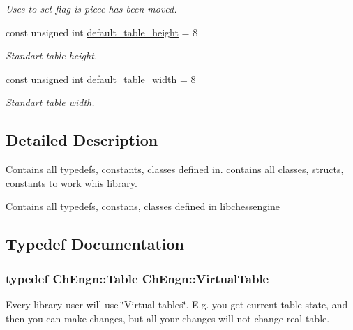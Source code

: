 \begin{DoxyCompactItemize}
\begin{DoxyCompactList}\small\item\em Uses to set flag is piece has been moved. \item\end{DoxyCompactList}\item 
\hypertarget{namespaceChEngn_ae87757a4f2d9ae9e25d48213cad79ddd}{
const unsigned int \hyperlink{namespaceChEngn_ae87757a4f2d9ae9e25d48213cad79ddd}{default\_\-table\_\-height} = 8}
\label{namespaceChEngn_ae87757a4f2d9ae9e25d48213cad79ddd}

\begin{DoxyCompactList}\small\item\em Standart table height. \item\end{DoxyCompactList}\item 
\hypertarget{namespaceChEngn_a9dc4a83c122aec6e170ad7a1d40efd8a}{
const unsigned int \hyperlink{namespaceChEngn_a9dc4a83c122aec6e170ad7a1d40efd8a}{default\_\-table\_\-width} = 8}
\label{namespaceChEngn_a9dc4a83c122aec6e170ad7a1d40efd8a}

\begin{DoxyCompactList}\small\item\em Standart table width. \item\end{DoxyCompactList}\end{DoxyCompactItemize}


\subsection{Detailed Description}
Contains all typedefs, constants, classes defined in. contains all classes, structs, constants to work whis library.

Contains all typedefs, constans, classes defined in libchessengine 

\subsection{Typedef Documentation}
\hypertarget{namespaceChEngn_a5ba229504d25ed1b2086f1df62f6db41}{
\subsubsection[{VirtualTable}]{\setlength{\rightskip}{0pt plus 5cm}typedef {\bf ChEngn::Table} {\bf ChEngn::VirtualTable}}}
\label{namespaceChEngn_a5ba229504d25ed1b2086f1df62f6db41}
Every library user will use \char`\"{}Virtual tables\char`\"{}. E.g. you get current table state, and then you can make changes, but all your changes will not change real table. 